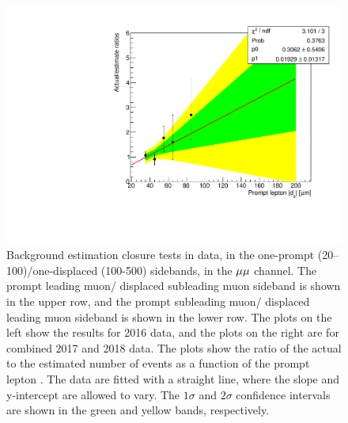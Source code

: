 \begin{figure}[hbtp]
\includegraphics[scale=0.35]{figures/bg/mumu_data_2017_2018_displacedLeading_ratiosVsPromptD0.pdf}
\caption{Background estimation closure tests in data, in the one-prompt (20--100\mum)/one-displaced (100-500\mum) sidebands, in the ${\mu}{\mu}$ channel. The prompt leading muon/ displaced subleading muon sideband is shown in the upper row, and the prompt subleading muon/ displaced leading muon sideband is shown in the lower row. The plots on the left show the results for 2016 data, and the plots on the right are for combined 2017 and 2018 data. The plots show the ratio of the actual to the estimated number of events as a function of the prompt lepton \ad. The data are fitted with a straight line, where the slope and y-intercept are allowed to vary. The $1\sigma$ and $2\sigma$ confidence intervals are shown in the green and yellow bands, respectively.}
\label{100to500um_fits_mumu}
\end{figure}